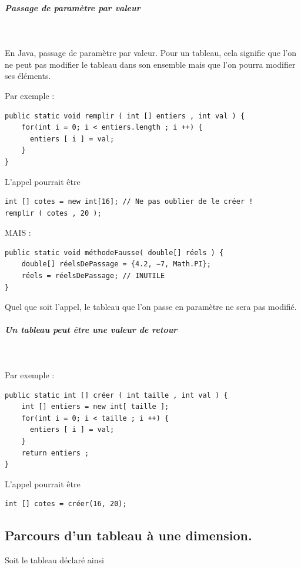 \documentclass[11pt,a4paper]{article}
\begin{document}
		\subparagraph{Passage de param\`etre par valeur} 
		
					\textcolor{white}{.} \par
				
        En Java, passage de param\`etre par valeur.
        Pour un tableau, cela signifie que l'on ne peut pas
        modifier le tableau dans son ensemble mais que
        l'on pourra modifier ses \'el\'ements.
      
            \par
        Par exemple :
            \par
        \begin{verbatim}
public static void remplir ( int [] entiers , int val ) {
    for(int i = 0; i < entiers.length ; i ++) {
      entiers [ i ] = val;
    }
}\end{verbatim}L'appel pourrait \^etre
            \par
        \begin{verbatim}
int [] cotes = new int[16]; // Ne pas oublier de le créer !
remplir ( cotes , 20 );
      \end{verbatim}MAIS :
            \par
        \begin{verbatim}
public static void méthodeFausse( double[] réels ) {
    double[] réelsDePassage = {4.2, −7, Math.PI};
    réels = réelsDePassage; // INUTILE
}\end{verbatim}
        Quel que soit l'appel, le tableau que l'on passe en
        param\`etre ne sera pas modifi\'e.
      
            \par
        
			
		\subparagraph{Un tableau peut \^etre une valeur de retour} 
		
					\textcolor{white}{.} \par
				
            \par
        Par exemple :
            \par
        \begin{verbatim}
public static int [] créer ( int taille , int val ) {
    int [] entiers = new int[ taille ];
    for(int i = 0; i < taille ; i ++) {
      entiers [ i ] = val;
    }
    return entiers ;
}\end{verbatim}L'appel pourrait \^etre
            \par
        \begin{verbatim}
int [] cotes = créer(16, 20);
      \end{verbatim}\subsection{Parcours d'un tableau \`a une dimension.}
		    Soit le tableau \verb@tab@ d\'eclar\'e ainsi
		  
\end{document}
